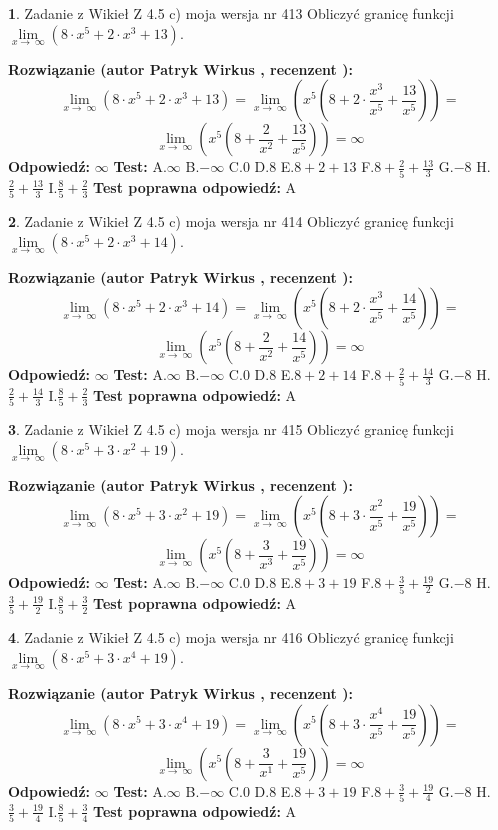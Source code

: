 \documentclass[12pt, a4paper]{article}
\theoremstyle{definition} %
\newtheorem{zad}{}
\newcommand{\zadStart}[1]{\begin{zad}#1\newline}
\newcommand{\zadStop}{\end{zad}}
\newcommand{\rozwStart}[2]{\noindent \textbf{Rozwiązanie (autor #1 , recenzent #2): }\newline}
\newcommand{\rozwStop}{\newline}
\newcommand{\odpStart}{\noindent \textbf{Odpowiedź:}\newline}
\newcommand{\odpStop}{\newline}
\newcommand{\testStart}{\noindent \textbf{Test:}\newline}
\newcommand{\testStop}{\newline}
\newcommand{\kluczStart}{\noindent \textbf{Test poprawna odpowiedź:}\newline}
\newcommand{\kluczStop}{\newline}
\begin{document}
\zadStart{Zadanie z Wikieł Z 4.5 c) moja wersja nr 413}
Obliczyć granicę funkcji  $\lim\limits_{x\to\ \infty}(8 \cdot x^{5}+2 \cdot x^{3}+13)$.
\zadStop
\rozwStart{Patryk Wirkus}{}
$$\lim\limits_{x\to\ \infty}(8 \cdot x^{5}+2 \cdot x^{3}+13) = \lim\limits_{x\to\ \infty}(x^{5}(8 +2 \cdot \frac{x^{3}}{x^{5}}+\frac{13}{x^{5}})) =$$ $$\lim\limits_{x\to\ \infty}(x^{5}(8 +\frac{2}{x^{2}}+\frac{13}{x^{5}})) =\infty$$
\rozwStop
\odpStart
$\infty$
\odpStop
\testStart
A.$\infty$ B.$-\infty$ C.$0$ D.$8$ E.$8 + 2 + 13$
F.$8+\frac{2}{5}+\frac{13}{3}$ G.$-8$
H.$\frac{2}{5}+\frac{13}{3}$
I.$\frac{8}{5}+\frac{2}{3}$
\testStop
\kluczStart
A
\kluczStop



\zadStart{Zadanie z Wikieł Z 4.5 c) moja wersja nr 414}
Obliczyć granicę funkcji  $\lim\limits_{x\to\ \infty}(8 \cdot x^{5}+2 \cdot x^{3}+14)$.
\zadStop
\rozwStart{Patryk Wirkus}{}
$$\lim\limits_{x\to\ \infty}(8 \cdot x^{5}+2 \cdot x^{3}+14) = \lim\limits_{x\to\ \infty}(x^{5}(8 +2 \cdot \frac{x^{3}}{x^{5}}+\frac{14}{x^{5}})) =$$ $$\lim\limits_{x\to\ \infty}(x^{5}(8 +\frac{2}{x^{2}}+\frac{14}{x^{5}})) =\infty$$
\rozwStop
\odpStart
$\infty$
\odpStop
\testStart
A.$\infty$ B.$-\infty$ C.$0$ D.$8$ E.$8 + 2 + 14$
F.$8+\frac{2}{5}+\frac{14}{3}$ G.$-8$
H.$\frac{2}{5}+\frac{14}{3}$
I.$\frac{8}{5}+\frac{2}{3}$
\testStop
\kluczStart
A
\kluczStop



\zadStart{Zadanie z Wikieł Z 4.5 c) moja wersja nr 415}
Obliczyć granicę funkcji  $\lim\limits_{x\to\ \infty}(8 \cdot x^{5}+3 \cdot x^{2}+19)$.
\zadStop
\rozwStart{Patryk Wirkus}{}
$$\lim\limits_{x\to\ \infty}(8 \cdot x^{5}+3 \cdot x^{2}+19) = \lim\limits_{x\to\ \infty}(x^{5}(8 +3 \cdot \frac{x^{2}}{x^{5}}+\frac{19}{x^{5}})) =$$ $$\lim\limits_{x\to\ \infty}(x^{5}(8 +\frac{3}{x^{3}}+\frac{19}{x^{5}})) =\infty$$
\rozwStop
\odpStart
$\infty$
\odpStop
\testStart
A.$\infty$ B.$-\infty$ C.$0$ D.$8$ E.$8 + 3 + 19$
F.$8+\frac{3}{5}+\frac{19}{2}$ G.$-8$
H.$\frac{3}{5}+\frac{19}{2}$
I.$\frac{8}{5}+\frac{3}{2}$
\testStop
\kluczStart
A
\kluczStop



\zadStart{Zadanie z Wikieł Z 4.5 c) moja wersja nr 416}
Obliczyć granicę funkcji  $\lim\limits_{x\to\ \infty}(8 \cdot x^{5}+3 \cdot x^{4}+19)$.
\zadStop
\rozwStart{Patryk Wirkus}{}
$$\lim\limits_{x\to\ \infty}(8 \cdot x^{5}+3 \cdot x^{4}+19) = \lim\limits_{x\to\ \infty}(x^{5}(8 +3 \cdot \frac{x^{4}}{x^{5}}+\frac{19}{x^{5}})) =$$ $$\lim\limits_{x\to\ \infty}(x^{5}(8 +\frac{3}{x^{1}}+\frac{19}{x^{5}})) =\infty$$
\rozwStop
\odpStart
$\infty$
\odpStop
\testStart
A.$\infty$ B.$-\infty$ C.$0$ D.$8$ E.$8 + 3 + 19$
F.$8+\frac{3}{5}+\frac{19}{4}$ G.$-8$
H.$\frac{3}{5}+\frac{19}{4}$
I.$\frac{8}{5}+\frac{3}{4}$
\testStop
\kluczStart
A
\kluczStop
\end{document}
